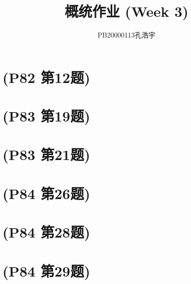 \documentclass{article}
\title{概统作业 (Week 3)}
\author{PB20000113孔浩宇}
\begin{document}
\maketitle
\section{(P82 第12题)}  %

\section{(P83 第19题)}  %

\section{(P83 第21题)}  %

\section{(P84 第26题)}  %

\section{(P84 第28题)}  %

\section{(P84 第29题)}  %
\end{document}
